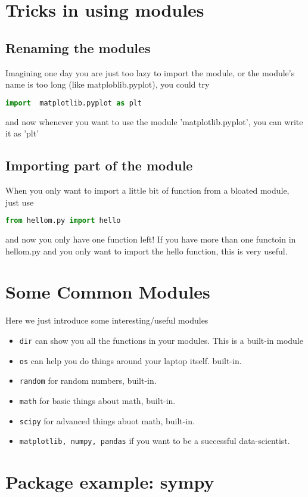 \documentclass[12pt]{article}
\begin{document}
\section{Tricks in using modules}
\subsection{Renaming the modules}
Imagining one day you are just too lazy to import the module, or the module's name is too long (like matploblib.pyplot), you could try
\begin{lstlisting}[language=python,caption=alias]
    import  matplotlib.pyplot as plt
\end{lstlisting}

and now whenever you want to use the module 'matplotlib.pyplot', you can write it as 'plt'
\subsection{Importing part of the module}
When you only want to import a little bit of function from a bloated module, just use
\begin{lstlisting}[language=python,caption=import part]
    from hellom.py import hello
\end{lstlisting}
and now you only have one function left! If you have more than one functoin in hellom.py and you only want to import the hello function, this is very useful.
\section{Some Common Modules}
Here we just introduce some interesting/useful modules
\begin{itemize}
    \item \texttt{dir} can show you all the functions in your modules. This is a built-in module
    \item \texttt{os} can help you do things around your laptop itself. built-in.
    \item \texttt{random} for random numbers, built-in.
    \item \texttt{math} for basic things about math, built-in.
    \item \texttt{scipy} for advanced things abuot math, built-in.
    \item \texttt{matplotlib, numpy, pandas} if you want to be a successful data-scientist.
\end{itemize}
\section{Package example: sympy}
\end{document}
